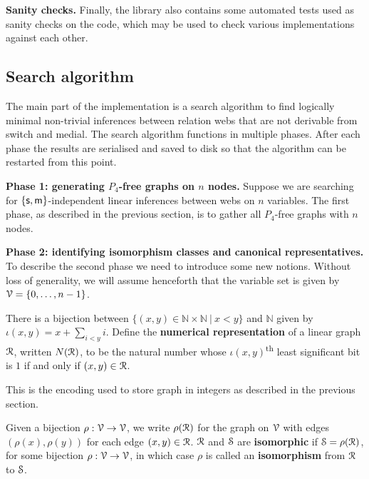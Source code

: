 \documentclass[a4paper, UKenglish, cleveref]{lipics-v2019}
\begin{document}
\textbf{Sanity checks.}
Finally, the library also contains some automated tests used as sanity checks on the code, which may be used to check various implementations against each other.

\subsection{Search algorithm}
\label{sec:search}

The main part of the implementation is a search algorithm to find logically minimal non-trivial inferences between relation webs that are not derivable from switch and medial. The search algorithm functions in multiple phases. After each phase the results are serialised and saved to disk so that the algorithm can be restarted from this point.

\textbf{Phase 1: generating $P_4$-free graphs on $n$ nodes.}
Suppose we are searching for $\{\s,\m \}$-independent linear inferences between webs on \(n\) variables. The first phase, as described in the previous section, is to gather all \(P_4\)-free graphs with \(n\) nodes.

\textbf{Phase 2: identifying isomorphism classes and canonical representatives.}
To describe the second phase we need to introduce some new notions. Without loss of generality, we will assume henceforth that the variable set is given by \(\V = \{0,\dots,n-1\}\).

\begin{definition}\label{def:num-rep}
  There is a bijection between \(\{(x,y) \in \mathbb{N} \times \mathbb{N}\ |\ x < y\}\) and \(\mathbb{N}\) given by \(\iota(x,y) = x + \sum_{i < y} i\). Define the \textbf{numerical representation} of a linear graph \(\R\), written \(N(\R)\), to be the natural number whose \(\iota(x,y)\)\textsuperscript{th} least significant bit is \(1\) if and only if \((x,y) \in \R\).
\end{definition}

This is the encoding used to store graph in integers as described in the previous section.

\begin{definition}
Given a bijection $\rho: \V\to \V$, we write $\rho(\R)$ for the graph on $\V$ with edges $(\rho(x),\rho(y))$ for each edge $(x,y) \in \R$.
$\R$ and $\S$ are \textbf{isomorphic} if $\S = \rho(\R)$, for some bijection $\rho: \V\to \V$, in which case $\rho$ is called an \textbf{isomorphism} from $\R $ to $\S$.
\end{definition}
\end{document}
